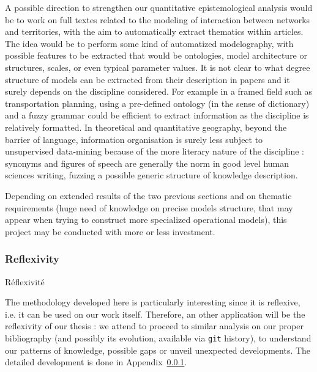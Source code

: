 
A possible direction to strengthen our quantitative epistemological analysis would be to work on full textes related to the modeling of interaction between networks and territories, with the aim to automatically extract thematics within articles. The idea would be to perform some kind of automatized modelography, with possible features to be extracted that would be ontologies, model architecture or structures, scales, or even typical parameter values. It is not clear to what degree structure of models can be extracted from their description in papers and it surely depends on the discipline considered. For example in a framed field such as transportation planning, using a pre-defined ontology (in the sense of dictionary) and a fuzzy grammar could be efficient to extract information as the discipline is relatively formatted. In theoretical and quantitative geography, beyond the barrier of language, information organisation is surely less subject to unsupervised data-mining because of the more literary nature of the discipline : synonyms and figures of speech are generally the norm in good level human sciences writing, fuzzing a possible generic structure of knowledge description. 

Depending on extended results of the two previous sections and on thematic requirements (huge need of knowledge on precise models structure, that may appear when trying to construct more specialized operational models), this project may be conducted with more or less investment.




\subsubsection{Reflexivity}{Réflexivité}


The methodology developed here is particularly interesting since it is reflexive, i.e. it can be used on our work itself. Therefore, an other application will be the reflexivity of our thesis : we attend to proceed to similar analysis on our proper bibliography (and possibly its evolution, available via \texttt{git} history), to understand our patterns of knowledge, possible gaps or unveil unexpected developments. The detailed development is done in Appendix~\ref{}.





